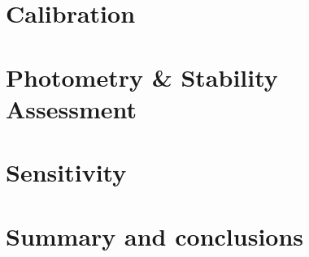 \documentclass[traditionalabstract]{aa}
\begin{document}
\section{Calibration}
\label{se:calibration}



\section{Photometry \& Stability Assessment}
\label{se:photometry}


\section{Sensitivity}
\label{se:sensitivity}



\section{Summary and conclusions}
\label{se:summary}
\end{document}
